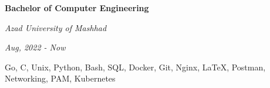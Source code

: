 \documentclass{engineercv}
\begin{document}
\begin{minipage}{\textwidth}
  \begin{multicols}{2}
    \begin{minipage}{0.5\textwidth}
      \textbf{Bachelor of Computer Engineering}

      \textit{Azad University of Mashhad}

      \textit{Aug, 2022 - Now}
    \end{minipage}
    \columnbreak
    \begin{minipage}{0.5\textwidth}
      Go, C, Unix, Python, Bash, SQL, Docker, Git,
      Nginx, \LaTeX, Postman, Networking, PAM, Kubernetes
    \end{minipage}
  \end{multicols}
\end{minipage}
\end{document}
